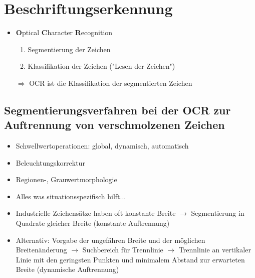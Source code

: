 \documentclass[11pt]{article}
\begin{document}
\section{Beschriftungserkennung}
    \begin{itemize}
        \item \textbf{O}ptical \textbf{C}haracter \textbf{R}ecognition
            \begin{enumerate}
                \item Segmentierung der Zeichen
                \item Klassifikation der Zeichen ("Lesen der Zeichen")
            \end{enumerate}
        $\Rightarrow$ OCR ist die Klassifikation der segmentierten Zeichen
    \end{itemize}
\subsection{Segmentierungsverfahren bei der OCR zur Auftrennung von verschmolzenen Zeichen}
    \begin{itemize}
        \item Schwellwertoperationen: global, dynamisch, automatisch
        \item Beleuchtungskorrektur
        \item Regionen-, Grauwertmorphologie
        \item Alles was situationsspezifisch hilft...
    \end{itemize}
    \begin{itemize}
        \item Industrielle Zeichensätze haben oft konstante Breite $\rightarrow$ Segmentierung in Quadrate gleicher Breite (konstante Auftrennung)
        \item Alternativ: Vorgabe der ungefähren Breite und der möglichen Breitenänderung $\rightarrow$ Suchbereich für Trennlinie $\rightarrow$ Trennlinie an vertikaler Linie mit den geringsten Punkten und minimalem Abstand zur erwarteten Breite (dynamische Auftrennung)
    \end{itemize}
\end{document}
